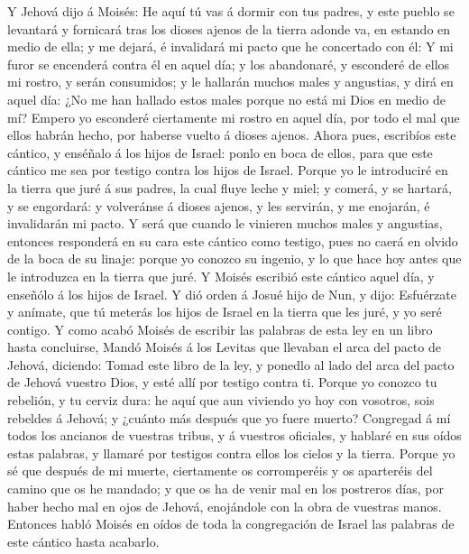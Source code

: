  Y Jehová dijo á Moisés: He aquí tú vas á dormir con tus
padres, y este pueblo se levantará y fornicará tras los dioses ajenos de
la tierra adonde va, en estando en medio de ella; y me dejará, é
invalidará mi pacto que he concertado con él:  Y mi furor
se encenderá contra él en aquel día; y los abandonaré, y esconderé de
ellos mi rostro, y serán consumidos; y le hallarán muchos males y
angustias, y dirá en aquel día: ¿No me han hallado estos males porque no
está mi Dios en medio de mí?  Empero yo esconderé
ciertamente mi rostro en aquel día, por todo el mal que ellos habrán
hecho, por haberse vuelto á dioses ajenos.  Ahora pues,
escribíos este cántico, y enséñalo á los hijos de Israel: ponlo en boca
de ellos, para que este cántico me sea por testigo contra los hijos de
Israel.  Porque yo le introduciré en la tierra que juré á
sus padres, la cual fluye leche y miel; y comerá, y se hartará, y se
engordará: y volveránse á dioses ajenos, y les servirán, y me enojarán,
é invalidarán mi pacto.  Y será que cuando le vinieren
muchos males y angustias, entonces responderá en su cara este cántico
como testigo, pues no caerá en olvido de la boca de su linaje: porque yo
conozco su ingenio, y lo que hace hoy antes que le introduzca en la
tierra que juré.  Y Moisés escribió este cántico aquel día,
y enseñólo á los hijos de Israel.  Y dió orden á Josué hijo
de Nun, y dijo: Esfuérzate y anímate, que tú meterás los hijos de Israel
en la tierra que les juré, y yo seré contigo.  Y como acabó
Moisés de escribir las palabras de esta ley en un libro hasta
concluirse,  Mandó Moisés á los Levitas que llevaban el
arca del pacto de Jehová, diciendo:  Tomad este libro de la
ley, y ponedlo al lado del arca del pacto de Jehová vuestro Dios, y esté
allí por testigo contra ti.  Porque yo conozco tu rebelión,
y tu cerviz dura: he aquí que aun viviendo yo hoy con vosotros, sois
rebeldes á Jehová; y ¿cuánto más después que yo fuere muerto?
 Congregad á mí todos los ancianos de vuestras tribus, y á
vuestros oficiales, y hablaré en sus oídos estas palabras, y llamaré por
testigos contra ellos los cielos y la tierra.  Porque yo sé
que después de mi muerte, ciertamente os corromperéis y os aparteréis
del camino que os he mandado; y que os ha de venir mal en los postreros
días, por haber hecho mal en ojos de Jehová, enojándole con la obra de
vuestras manos.  Entonces habló Moisés en oídos de toda la
congregación de Israel las palabras de este cántico hasta acabarlo.

